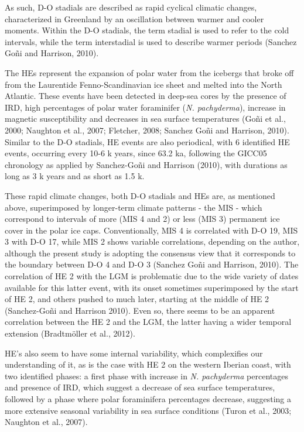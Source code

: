 \documentclass[12pt,twoside]{reedthesis}
\begin{document}
As such, D-O stadials are described as rapid cyclical climatic changes, characterized in Greenland by an oscillation between warmer and cooler moments. Within the D-O stadials, the term stadial is used to refer to the cold intervals, while the term interstadial is used to describe warmer periods (Sanchez Goñi and Harrison, 2010).

The HEs represent the expansion of polar water from the icebergs that broke off from the Laurentide Fenno-Scandinavian ice sheet and melted into the North Atlantic. These events have been detected in deep-sea cores by the presence of IRD, high percentages of polar water foraminifer (\emph{N. pachyderma}), increase in magnetic susceptibility and decreases in sea surface temperatures (Goñi et al., 2000; Naughton et al., 2007; Fletcher, 2008; Sanchez Goñi and Harrison, 2010). Similar to the D-O stadials, HE events are also periodical, with 6 identified HE events, occurring every 10-6 k years, since 63.2 ka, following the GICC05 chronology as applied by Sanchez-Goñi and Harrison (2010), with durations as long as 3 k years and as short as 1.5 k.

These rapid climate changes, both D-O stadials and HEs are, as mentioned above, superimposed by longer-term climate patterns - the MIS - which correspond to intervals of more (MIS 4 and 2) or less (MIS 3) permanent ice cover in the polar ice caps. Conventionally, MIS 4 is correlated with D-O 19, MIS 3 with D-O 17, while MIS 2 shows variable correlations, depending on the author, although the present study is adopting the consensus view that it corresponds to the boundary between D-O 4 and D-O 3 (Sanchez Goñi and Harrison, 2010).
The correlation of HE 2 with the LGM is problematic due to the wide variety of dates available for this latter event, with its onset sometimes superimposed by the start of HE 2, and others pushed to much later, starting at the middle of HE 2 (Sanchez-Goñi and Harrison 2010). Even so, there seems to be an apparent correlation between the HE 2 and the LGM, the latter having a wider temporal extension (Bradtmöller et al., 2012).

HE's also seem to have some internal variability, which complexifies our understanding of it, as is the case with HE 2 on the western Iberian coast, with two identified phases: a first phase with increase in \emph{N. pachyderma} percentages and presence of IRD, which suggest a decrease of sea surface temperatures, followed by a phase where polar foraminifera percentages decrease, suggesting a more extensive seasonal variability in sea surface conditions (Turon et al., 2003; Naughton et al., 2007).
\end{document}
